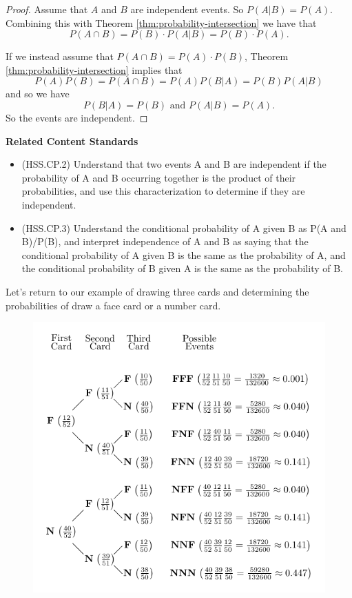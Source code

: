 \documentclass[
]{book}
\providecommand{\tightlist}{%
  \setlength{\itemsep}{0pt}\setlength{\parskip}{0pt}}
\newenvironment{standards}{}{}
\theoremstyle{definition}
\theoremstyle{definition}
\theoremstyle{definition}
\theoremstyle{definition}
\theoremstyle{remark}
\begin{document}
\begin{proof}
Assume that \(A\) and \(B\) are independent events. So \(P(A|B)=P(A)\). Combining this with Theorem \ref{thm:probability-intersection} we have that \[P(A\cap B) = P(B)\cdot P(A|B) = P(B)\cdot P(A).\]

If we instead assume that \(P(A\cap B)=P(A)\cdot P(B)\), Theorem \ref{thm:probability-intersection} implies that
\[P(A) P(B) = P(A\cap B) = P(A) P(B|A) = P(B)P(A|B)\] and so we have
\[P(B|A) = P(B) \mbox{ and } P(A|B)=P(A).\] So the events are independent.
\end{proof}

\begin{standards}

\begin{center}
\textbf{Related Content Standards}

\end{center}

\begin{itemize}
\tightlist
\item
  (HSS.CP.2) Understand that two events A and B are independent if the probability of A and B occurring together is the product of their probabilities, and use this characterization to determine if they are independent.
\item
  (HSS.CP.3) Understand the conditional probability of A given B as P(A and B)/P(B), and interpret independence of A and B as saying that the conditional probability of A given B is the same as the probability of A, and the conditional probability of B given A is the same as the probability of B.
\end{itemize}

\end{standards}

Let's return to our example of drawing three cards and determining the probabilities of draw a face card or a number card.

\begin{figure}

{\centering \includegraphics[width=0.65\linewidth]{tikz/tree_cards_face} 

}

\end{figure}
\end{document}
